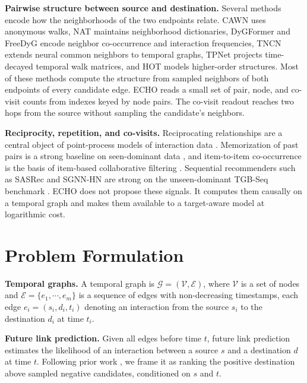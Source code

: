 \documentclass[twoside]{article}
\newcommand{\ours}{ECHO}
\begin{document}
\textbf{Pairwise structure between source and destination.}
Several methods encode how the neighborhoods of the two endpoints relate. CAWN \citep{wang2021cawn} uses anonymous walks, NAT \citep{luo2022neighborhood} maintains neighborhood dictionaries, DyGFormer \citep{yu2023dygformer} and FreeDyG \citep{tian2024freedyg} encode neighbor co-occurrence and interaction frequencies, TNCN \citep{zhang2024tncn} extends neural common neighbors to temporal graphs, TPNet \citep{lu2024tpnet} projects time-decayed temporal walk matrices, and HOT \citep{besta2024hot} models higher-order structures. Most of these methods compute the structure from sampled neighbors of both endpoints of every candidate edge. \ours{} reads a small set of pair, node, and co-visit counts from indexes keyed by node pairs. The co-visit readout reaches two hops from the source without sampling the candidate's neighbors.

\textbf{Reciprocity, repetition, and co-visits.}
Reciprocating relationships are a central object of point-process models of interaction data \citep{blundell2012modelling}. Memorization of past pairs is a strong baseline on seen-dominant data \citep{poursafaei2022towards}, and item-to-item co-occurrence is the basis of item-based collaborative filtering \citep{sarwar2001item}. Sequential recommenders such as SASRec \citep{kang2018sasrec} and SGNN-HN \citep{pan2020sgnnhn} are strong on the unseen-dominant TGB-Seq benchmark \citep{yi2025tgbseq}. \ours{} does not propose these signals. It computes them causally on a temporal graph and makes them available to a target-aware model at logarithmic cost.

\section{Problem Formulation}

\textbf{Temporal graphs.} A temporal graph is $\mathcal{G}=(\mathcal{V},\mathcal{E})$, where $\mathcal{V}$ is a set of nodes and $\mathcal{E}=\{e_1,\cdots,e_m\}$ is a sequence of edges with non-decreasing timestamps, each edge $e_i=(s_i,d_i,t_i)$ denoting an interaction from the source $s_i$ to the destination $d_i$ at time $t_i$.

\textbf{Future link prediction.} Given all edges before time $t$, future link prediction estimates the likelihood of an interaction between a source $s$ and a destination $d$ at time $t$. Following prior work \citep{huang2024tgb,yi2025tgbseq,yi2025craft}, we frame it as ranking the positive destination above sampled negative candidates, conditioned on $s$ and $t$.
\end{document}
